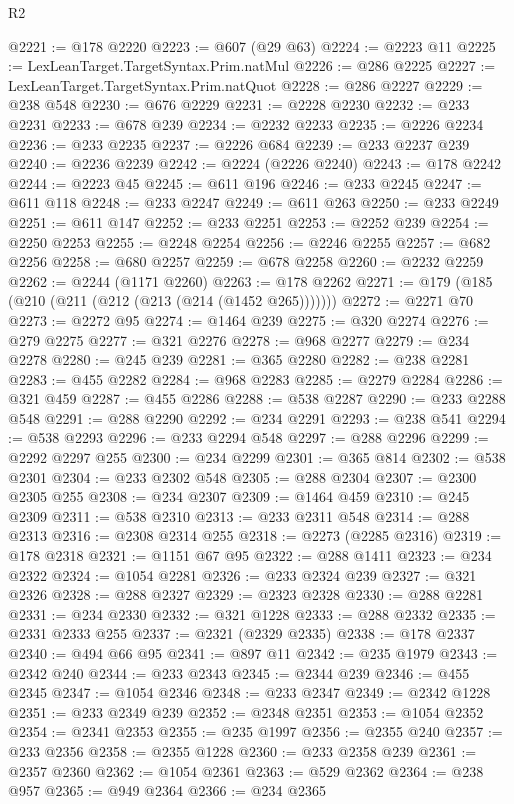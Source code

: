 \begin{lexlean}{R2}
\begin{coremodule}
@2221 := @178 @2220
@2223 := @607 (@29 @63)
@2224 := @2223 @11
@2225 := LexLeanTarget.TargetSyntax.Prim.natMul
@2226 := @286 @2225
@2227 := LexLeanTarget.TargetSyntax.Prim.natQuot
@2228 := @286 @2227
@2229 := @238 @548
@2230 := @676 @2229
@2231 := @2228 @2230
@2232 := @233 @2231
@2233 := @678 @239
@2234 := @2232 @2233
@2235 := @2226 @2234
@2236 := @233 @2235
@2237 := @2226 @684
@2239 := @233 @2237 @239
@2240 := @2236 @2239
@2242 := @2224 (@2226 @2240)
@2243 := @178 @2242
@2244 := @2223 @45
@2245 := @611 @196
@2246 := @233 @2245
@2247 := @611 @118
@2248 := @233 @2247
@2249 := @611 @263
@2250 := @233 @2249
@2251 := @611 @147
@2252 := @233 @2251
@2253 := @2252 @239
@2254 := @2250 @2253
@2255 := @2248 @2254
@2256 := @2246 @2255
@2257 := @682 @2256
@2258 := @680 @2257
@2259 := @678 @2258
@2260 := @2232 @2259
@2262 := @2244 (@1171 @2260)
@2263 := @178 @2262
@2271 := @179 (@185 (@210 (@211 (@212 (@213 (@214 (@1452 @265)))))))
@2272 := @2271 @70
@2273 := @2272 @95
@2274 := @1464 @239
@2275 := @320 @2274
@2276 := @279 @2275
@2277 := @321 @2276
@2278 := @968 @2277
@2279 := @234 @2278
@2280 := @245 @239
@2281 := @365 @2280
@2282 := @238 @2281
@2283 := @455 @2282
@2284 := @968 @2283
@2285 := @2279 @2284
@2286 := @321 @459
@2287 := @455 @2286
@2288 := @538 @2287
@2290 := @233 @2288 @548
@2291 := @288 @2290
@2292 := @234 @2291
@2293 := @238 @541
@2294 := @538 @2293
@2296 := @233 @2294 @548
@2297 := @288 @2296
@2299 := @2292 @2297 @255
@2300 := @234 @2299
@2301 := @365 @814
@2302 := @538 @2301
@2304 := @233 @2302 @548
@2305 := @288 @2304
@2307 := @2300 @2305 @255
@2308 := @234 @2307
@2309 := @1464 @459
@2310 := @245 @2309
@2311 := @538 @2310
@2313 := @233 @2311 @548
@2314 := @288 @2313
@2316 := @2308 @2314 @255
@2318 := @2273 (@2285 @2316)
@2319 := @178 @2318
@2321 := @1151 @67 @95
@2322 := @288 @1411
@2323 := @234 @2322
@2324 := @1054 @2281
@2326 := @233 @2324 @239
@2327 := @321 @2326
@2328 := @288 @2327
@2329 := @2323 @2328
@2330 := @288 @2281
@2331 := @234 @2330
@2332 := @321 @1228
@2333 := @288 @2332
@2335 := @2331 @2333 @255
@2337 := @2321 (@2329 @2335)
@2338 := @178 @2337
@2340 := @494 @66 @95
@2341 := @897 @11
@2342 := @235 @1979
@2343 := @2342 @240
@2344 := @233 @2343
@2345 := @2344 @239
@2346 := @455 @2345
@2347 := @1054 @2346
@2348 := @233 @2347
@2349 := @2342 @1228
@2351 := @233 @2349 @239
@2352 := @2348 @2351
@2353 := @1054 @2352
@2354 := @2341 @2353
@2355 := @235 @1997
@2356 := @2355 @240
@2357 := @233 @2356
@2358 := @2355 @1228
@2360 := @233 @2358 @239
@2361 := @2357 @2360
@2362 := @1054 @2361
@2363 := @529 @2362
@2364 := @238 @957
@2365 := @949 @2364
@2366 := @234 @2365

\end{coremodule}
\end{lexlean}
